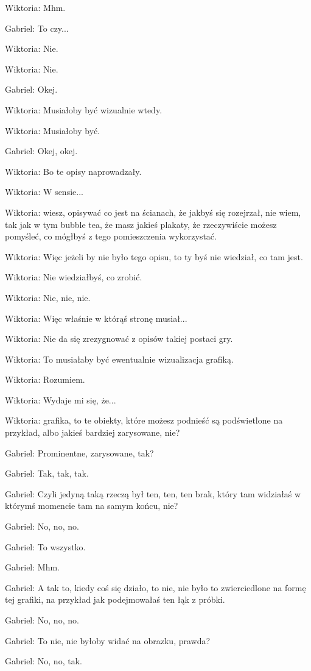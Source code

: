 Wiktoria: Mhm.

Gabriel: To czy...

Wiktoria: Nie.

Wiktoria: Nie.

Gabriel: Okej.

Wiktoria: Musiałoby być wizualnie wtedy.

Wiktoria: Musiałoby być.

Gabriel: Okej, okej.

Wiktoria: Bo te opisy naprowadzały.

Wiktoria: W sensie...

Wiktoria: wiesz, opisywać co jest na ścianach, że jakbyś się rozejrzał, nie wiem, tak jak w tym bubble tea, że masz jakieś plakaty, że rzeczywiście możesz pomyśleć, co mógłbyś z tego pomieszczenia wykorzystać.

Wiktoria: Więc jeżeli by nie było tego opisu, to ty byś nie wiedział, co tam jest.

Wiktoria: Nie wiedziałbyś, co zrobić.

Wiktoria: Nie, nie, nie.

Wiktoria: Więc właśnie w którąś stronę musiał...

Wiktoria: Nie da się zrezygnować z opisów takiej postaci gry.

Wiktoria: To musiałaby być ewentualnie wizualizacja grafiką.

Wiktoria: Rozumiem.

Wiktoria: Wydaje mi się, że...

Wiktoria: grafika, to te obiekty, które możesz podnieść są podświetlone na przykład, albo jakieś bardziej zarysowane, nie?

Gabriel: Prominentne, zarysowane, tak?

Gabriel: Tak, tak, tak.

Gabriel: Czyli jedyną taką rzeczą był ten, ten, ten brak, który tam widziałaś w którymś momencie tam na samym końcu, nie?

Gabriel: No, no, no.

Gabriel: To wszystko.

Gabriel: Mhm.

Gabriel: A tak to, kiedy coś się działo, to nie, nie było to zwierciedlone na formę tej grafiki, na przykład jak podejmowałaś ten łąk z próbki.

Gabriel: No, no, no.

Gabriel: To nie, nie byłoby widać na obrazku, prawda?

Gabriel: No, no, tak.

